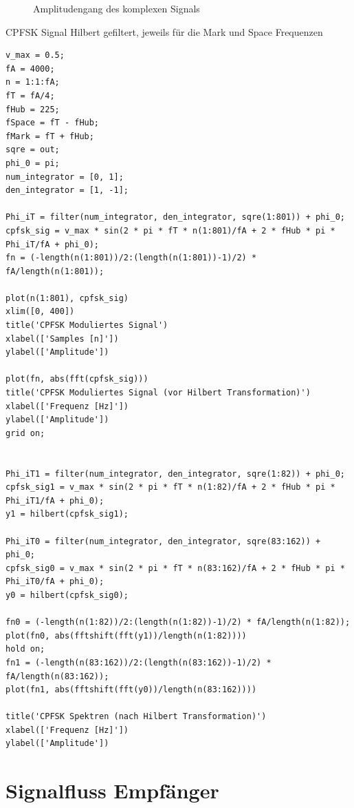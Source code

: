 \documentclass{article}
\begin{document}
\begin{figure}[!h]
    \centering
    \def\svgscale{0.5}
    \def\svgwidth{0.8\columnwidth}
    
    \caption{Amplitudengang des komplexen Signals}
    \label{fig:hilbert_nach}
\end{figure}

\begin{listing}\label{codeM:hilbert}
    \caption{CPFSK Signal Hilbert gefiltert, jeweils für die Mark und Space Frequenzen}
    \begin{verbatim}
v_max = 0.5;
fA = 4000;
n = 1:1:fA;
fT = fA/4;
fHub = 225;
fSpace = fT - fHub;
fMark = fT + fHub;
sqre = out;
phi_0 = pi;
num_integrator = [0, 1];
den_integrator = [1, -1];

Phi_iT = filter(num_integrator, den_integrator, sqre(1:801)) + phi_0;
cpfsk_sig = v_max * sin(2 * pi * fT * n(1:801)/fA + 2 * fHub * pi * Phi_iT/fA + phi_0);
fn = (-length(n(1:801))/2:(length(n(1:801))-1)/2) * fA/length(n(1:801));

plot(n(1:801), cpfsk_sig)
xlim([0, 400])
title('CPFSK Moduliertes Signal')
xlabel(['Samples [n]'])
ylabel(['Amplitude'])

plot(fn, abs(fft(cpfsk_sig)))
title('CPFSK Moduliertes Signal (vor Hilbert Transformation)')
xlabel(['Frequenz [Hz]'])
ylabel(['Amplitude'])
grid on;


Phi_iT1 = filter(num_integrator, den_integrator, sqre(1:82)) + phi_0;
cpfsk_sig1 = v_max * sin(2 * pi * fT * n(1:82)/fA + 2 * fHub * pi * Phi_iT1/fA + phi_0);
y1 = hilbert(cpfsk_sig1);

Phi_iT0 = filter(num_integrator, den_integrator, sqre(83:162)) + phi_0;
cpfsk_sig0 = v_max * sin(2 * pi * fT * n(83:162)/fA + 2 * fHub * pi * Phi_iT0/fA + phi_0);
y0 = hilbert(cpfsk_sig0);

fn0 = (-length(n(1:82))/2:(length(n(1:82))-1)/2) * fA/length(n(1:82));
plot(fn0, abs(fftshift(fft(y1))/length(n(1:82))))
hold on;
fn1 = (-length(n(83:162))/2:(length(n(83:162))-1)/2) * fA/length(n(83:162));
plot(fn1, abs(fftshift(fft(y0))/length(n(83:162))))

title('CPFSK Spektren (nach Hilbert Transformation)')
xlabel(['Frequenz [Hz]'])
ylabel(['Amplitude'])
    \end{verbatim}
\end{listing}


\section{Signalfluss Empfänger}
\end{document}
